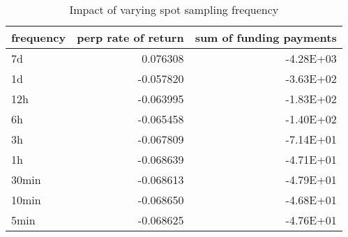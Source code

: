 \begin{table}[!htbp]
\caption{Impact of varying spot sampling frequency}
\label{tbl:spot_sampling}
\begin{tabular}{lrr}
\toprule
frequency & perp rate of return & sum of funding payments \\
\midrule
7d & 0.076308 & -4.28E+03 \\
1d & -0.057820 & -3.63E+02 \\
12h & -0.063995 & -1.83E+02 \\
6h & -0.065458 & -1.40E+02 \\
3h & -0.067809 & -7.14E+01 \\
1h & -0.068639 & -4.71E+01 \\
30min & -0.068613 & -4.79E+01 \\
10min & -0.068650 & -4.68E+01 \\
5min & -0.068625 & -4.76E+01 \\
\bottomrule
\end{tabular}
\end{table}
